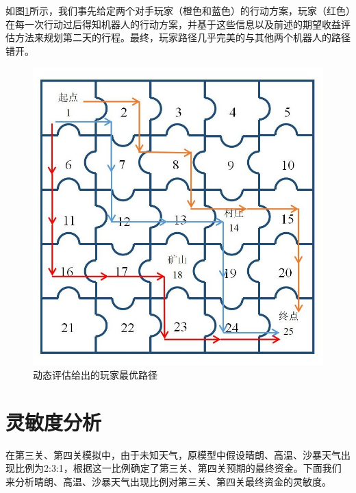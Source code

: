 \documentclass[withoutpreface,bwprint]{cumcmthesis} %
\begin{document}
如图\ref{fig:map6path}所示，我们事先给定两个对手玩家（橙色和蓝色）的行动方案，玩家（红色）在每一次行动过后得知机器人的行动方案，并基于这些信息以及前述的期望收益评估方法来规划第二天的行程。最终，玩家路径几乎完美的与其他两个机器人的路径错开。
\begin{figure}[H]
	\centering
	\includegraphics[scale=0.4]{figures/map6path}
	\caption{动态评估给出的玩家最优路径}
	\label{fig:map6path}
\end{figure}
\section{灵敏度分析}
在第三关、第四关模拟中，由于未知天气，原模型中假设晴朗、高温、沙暴天气出现比例为2:3:1，根据这一比例确定了第三关、第四关预期的最终资金。下面我们来分析晴朗、高温、沙暴天气出现比例对第三关、第四关最终资金的灵敏度。
\end{document}
